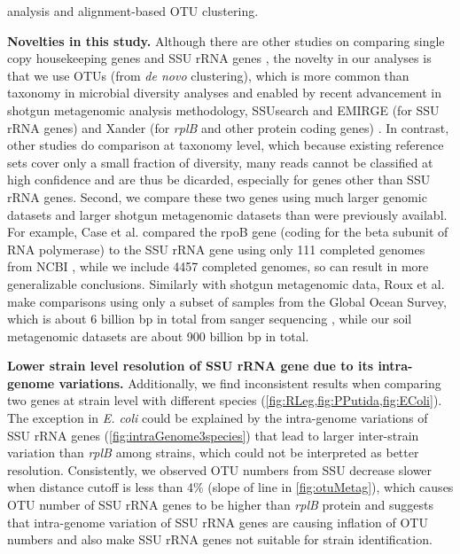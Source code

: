 \documentclass[]{msu-thesis}
\begin{document}
analysis and alignment-based OTU clustering.

\textbf{Novelties in this study. }
Although there are other studies on comparing single copy housekeeping genes and SSU rRNA genes \cite{case_use_2007,roux_comparison_2011}, the novelty in our analyses is that we use OTUs (from \textit{de novo} clustering), which is more common than taxonomy in microbial diversity analyses and enabled by recent advancement in shotgun metagenomic analysis methodology, SSUsearch and EMIRGE (for SSU rRNA genes) \cite{guo_microbial_2015,miller_short-read_2013} and Xander (for \textit{rplB} and other protein coding genes) \cite{wang_xander:_2015}. In contrast, other studies do comparison at taxonomy level, which because existing reference sets cover only a small fraction of diversity, many reads cannot be classified at high confidence and are thus be dicarded, especially for genes other than SSU rRNA genes. Second, we compare these two genes using much larger genomic datasets and larger shotgun metagenomic datasets than were previously availabl. For example, Case et al. compared the rpoB gene (coding for the beta subunit of RNA polymerase) to the SSU rRNA gene using only 111 completed genomes from NCBI \cite{case_use_2007}, while we include 4457 completed genomes, so can result in more generalizable conclusions. Similarly with shotgun metagenomic data, Roux et al. make comparisons using only a subset of samples from the Global Ocean Survey, which is about 6 billion bp in total from sanger sequencing \cite{roux_comparison_2011,rusch_sorcerer_2007}, while our soil metagenomic datasets are about 900 billion bp in total.


\textbf{Lower strain level resolution of SSU rRNA gene due to its intra-genome variations. }
Additionally, we find inconsistent results when comparing two genes at strain level with different species (\cref{fig:RLeg,fig:PPutida,fig:EColi}). The exception in \textit{E. coli} could be explained by the intra-genome variations of SSU rRNA genes (\cref{fig:intraGenome3species}) that lead to larger inter-strain variation than \textit{rplB} among strains, which could not be interpreted as better resolution. Consistently, we observed OTU numbers from SSU decrease slower when distance cutoff is less than 4\% (slope of line in \cref{fig:otuMetag}), which causes OTU number of SSU rRNA genes to be higher than \textit{rplB} protein and suggests that intra-genome variation of SSU rRNA genes are causing inflation of OTU numbers \cite{sun_intragenomic_2013} and also make SSU rRNA genes not suitable for strain identification.
\end{document}
